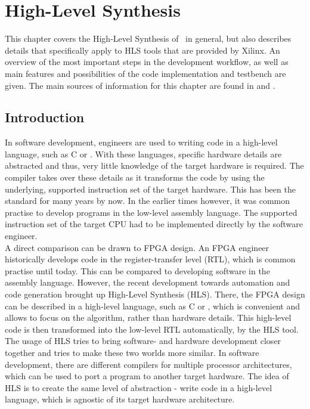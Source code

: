 \chapter{High-Level Synthesis}
\label{cha:HLS}

This chapter covers the High-Level Synthesis of \cplusplus\ in general, but also describes details that specifically apply to HLS tools that are provided by Xilinx.
An overview of the most important steps in the development workflow, as well as main features and possibilities of the code implementation and testbench are given.
The main sources of information for this chapter are found in \cite{VivadoUgHLSIntro}and \cite{VivadoUgHLS}.

\section{Introduction}

In software development, engineers are used to writing code in a high-level language, such as C or \cplusplus.
With these languages, specific hardware details are abstracted and thus, very little knowledge of the target hardware is required.
The compiler takes over these details as it transforms the code by using the underlying, supported instruction set of the target hardware.
This has been the standard for many years by now.
In the earlier times however, it was common practise to develop programs in the low-level assembly language.
The supported instruction set of the target CPU had to be implemented directly by the software engineer.\\

A direct comparison can be drawn to FPGA design.
An FPGA engineer historically develops code in the register-transfer level (RTL), which is common practise until today.
This can be compared to developing software in the assembly language.
However, the recent development towards automation and code generation brought up High-Level Synthesis (HLS).
There, the FPGA design can be described in a high-level language, such as C or \cplusplus, which is convenient and allows to focus on the algorithm, rather than hardware details.
This high-level code is then transformed into the low-level RTL automatically, by the HLS tool.\\

The usage of HLS tries to bring software- and hardware development closer together and tries to make these two worlds more similar.
In software development, there are different compilers for multiple processor architectures, which can be used to port a program to another target hardware.
The idea of HLS is to create the same level of abstraction - write code in a high-level language, which is agnostic of its target hardware architecture.\\


